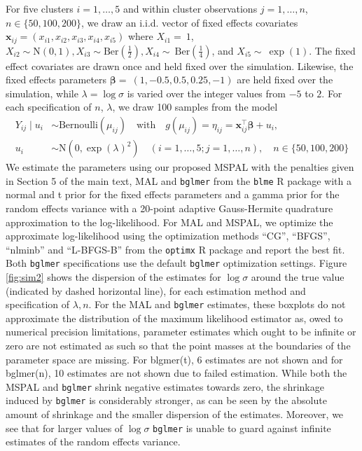 \documentclass[11pt, a4paper]{article}
\newcommand*{\bb}{\boldsymbol}
\theoremstyle{example} \newtheorem{example}{Example}[section]
\theoremstyle{theorem} \newtheorem{theorem}{Theorem}[section]
\theoremstyle{theorem }\newtheorem{proposition}{Proposition}[section]
\theoremstyle{theorem }\newtheorem{corollary}{Corollary}[section]
\def\\bbeta{\bb{\\bbeta}}
\def\bx{\bb{x}}
\begin{document}
For five clusters $i=1,\ldots,5$ and within cluster observations $j=1,\ldots,n$, $n \in \{50,100,200\}$, we draw an i.i.d. vector of fixed effects covariates $\bx_{ij} = (x_{i1},x_{i2},x_{i3},x_{i4},x_{i5})$ where $X_{i1}=~1$, ${X}_{i2} \sim \text{N}(0,1), {X}_{i3}\sim \textrm{Ber}\left(\frac{1}{2}\right), {X}_{i4}\sim~\textrm{Ber}\left(\frac{1}{4}\right)$, and ${X}_{i5}\sim~\exp(1)$. The fixed effect covariates are drawn once and held fixed over the simulation. Likewise, the fixed effects parameters $\bb \beta  =~(1,-0.5,0.5,0.25,-1)$ are held fixed over the simulation, while $\lambda = \log \sigma$ is varied  over the integer values from $-5$ to $2$. For each specification of $n$, $\lambda$, we draw 100 samples from the model 
\begin{equation}
\begin{aligned}
\label{eq:sim2_model} 
Y_{ij} \mid {u}_i & \sim \text{Bernoulli}(\mu_{ij}) \quad \text{with} \quad
g(\mu_{ij}) = \eta_{ij} = \bx_{ij}^\top \bb \beta + u_i,\\
u_i & \sim \text{N}(0, \exp (\lambda)^2 )  \quad (i = 1, \ldots, 5; j = 1, \ldots, n), \quad n\in \{50,100,200\}
\end{aligned}
\end{equation}
We estimate the parameters using our proposed MSPAL with the penalties given in Section 5 of the main text, MAL and \texttt{bglmer}  from the \texttt{blme} R package \citep{chung+etal:2013} with a normal and t prior for the fixed effects parameters and a gamma prior for the random effects variance with a 20-point adaptive Gauss-Hermite quadrature approximation to the log-likelihood. For MAL and MSPAL, we optimize the approximate log-likelihood using the optimization methods ``CG'', ``BFGS'', ``nlminb'' and ``L-BFGS-B'' from the \texttt{optimx} R package \citep{nash+varadhan:2011} and report the best fit. Both \texttt{bglmer} specifications use the default \texttt{bglmer} optimization settings. Figure \ref{fig:sim2} shows the dispersion of the estimates for $\log \sigma$ around the true value (indicated by dashed horizontal line), for each estimation method and specification of $\lambda ,n$. For the MAL and \texttt{bglmer} estimates, these boxplots do not approximate the distribution of the maximum likelihood estimator as, owed to numerical precision limitations, parameter estimates which ought to be infinite or zero are not estimated as such so that the point masses at the boundaries of the parameter space are missing. For blgmer(t), 6 estimates are not shown and for bglmer(n), 10 estimates are not shown due to failed estimation. While both the MSPAL and \texttt{bglmer} shrink negative estimates towards zero, the shrinkage induced by \texttt{bglmer} is considerably stronger, as can be seen by the absolute amount of shrinkage and the smaller dispersion of the estimates. Moreover, we see that for larger values of $\log \sigma$ \texttt{bglmer} is unable to guard against infinite estimates of the random effects variance. 
\end{document}
